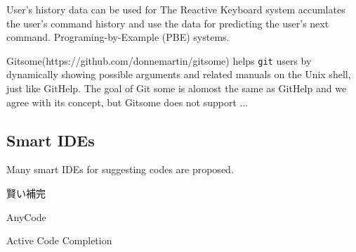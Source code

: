 \documentclass{sigchi}
\def\GH{\textsf{GitHelp}}
\begin{document}
User's history data can be used for 
The Reactive Keyboard system\cite{ReactiveKeyboard}
accumlates the user's command history and use the data
for predicting the user's next command.
Programing-by-Example (PBE) systems\cite{Cypher}\cite{Lieberman}.

Gitsome(https://github.com/donnemartin/gitsome)
helps \texttt{git} users by dynamically
showing possible arguments and related manuals on the Unix shell,
just like {\GH}.
The goal of Git some is alomost the same as {\GH} and we agree with its concept,
but Gitsome does not support ...

\subsection{Smart IDEs}

Many smart IDEs for suggesting codes are proposed.

賢い補完
\cite{Little:2006:TKC:1166253.1166275}

AnyCode\cite{Gvero:2015:SJE:2814270.2814295}

Active Code Completion\cite{Omar:2012:ACC:2337223.2337324}
\end{document}
